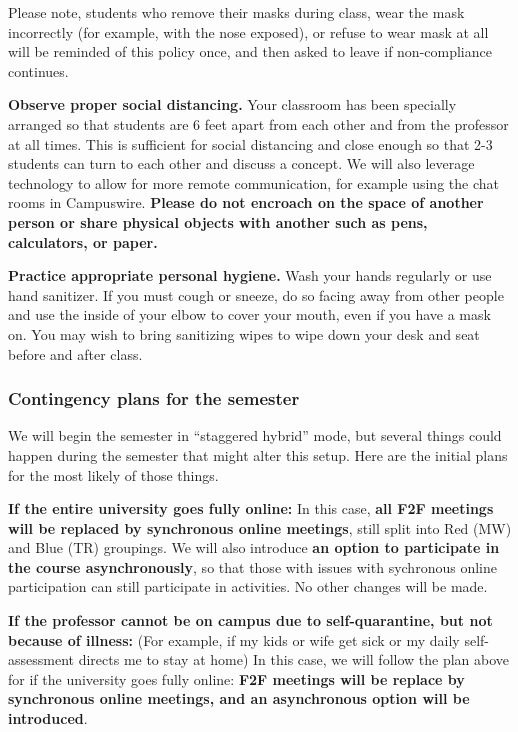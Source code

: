 \documentclass[]{article}
\begin{document}
Please note, students who remove their masks during class, wear the mask
incorrectly (for example, with the nose exposed), or refuse to wear mask
at all will be reminded of this policy once, and then asked to leave if
non-compliance continues.

\textbf{Observe proper social distancing.} Your classroom has been
specially arranged so that students are 6 feet apart from each other and
from the professor at all times. This is sufficient for social
distancing and close enough so that 2-3 students can turn to each other
and discuss a concept. We will also leverage technology to allow for
more remote communication, for example using the chat rooms in
Campuswire. \textbf{Please do not encroach on the space of another
person or share physical objects with another such as pens, calculators,
or paper.}

\textbf{Practice appropriate personal hygiene.} Wash your hands
regularly or use hand sanitizer. If you must cough or sneeze, do so
facing away from other people and use the inside of your elbow to cover
your mouth, even if you have a mask on. You may wish to bring sanitizing
wipes to wipe down your desk and seat before and after class.

\hypertarget{contingency-plans-for-the-semester}{%
\subsubsection{Contingency plans for the
semester}\label{contingency-plans-for-the-semester}}

We will begin the semester in ``staggered hybrid'' mode, but several
things could happen during the semester that might alter this setup.
Here are the initial plans for the most likely of those things.

\textbf{If the entire university goes fully online:} In this case,
\textbf{all F2F meetings will be replaced by synchronous online
meetings}, still split into Red (MW) and Blue (TR) groupings. We will
also introduce \textbf{an option to participate in the course
asynchronously}, so that those with issues with sychronous online
participation can still participate in activities. No other changes will
be made.

\textbf{If the professor cannot be on campus due to self-quarantine, but
not because of illness:} (For example, if my kids or wife get sick or my
daily self-assessment directs me to stay at home) In this case, we will
follow the plan above for if the university goes fully online:
\textbf{F2F meetings will be replace by synchronous online meetings, and
an asynchronous option will be introduced}.
\end{document}
